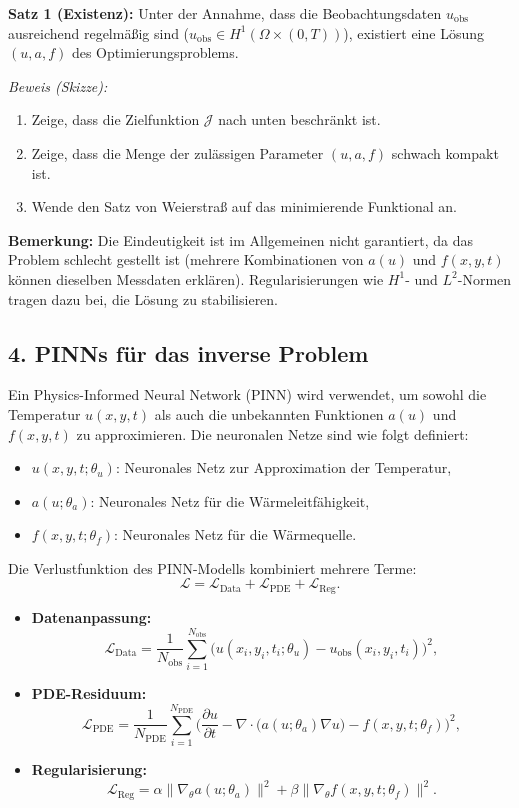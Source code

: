 \textbf{Satz 1 (Existenz):}  
Unter der Annahme, dass die Beobachtungsdaten \(u_\text{obs}\) ausreichend regelmäßig sind (\(u_\text{obs} \in H^1(\Omega \times (0, T))\)), existiert eine Lösung \((u, a, f)\) des Optimierungsproblems.

\textit{Beweis (Skizze):}
\begin{enumerate}
	\item Zeige, dass die Zielfunktion \(\mathcal{J}\) nach unten beschränkt ist.
	\item Zeige, dass die Menge der zulässigen Parameter \((u, a, f)\) schwach kompakt ist.
	\item Wende den Satz von Weierstraß auf das minimierende Funktional an.
\end{enumerate}

\textbf{Bemerkung:}  
Die Eindeutigkeit ist im Allgemeinen nicht garantiert, da das Problem schlecht gestellt ist (mehrere Kombinationen von \(a(u)\) und \(f(x, y, t)\) können dieselben Messdaten erklären). Regularisierungen wie \(H^1\)- und \(L^2\)-Normen tragen dazu bei, die Lösung zu stabilisieren.

\subsection*{4. PINNs für das inverse Problem}

Ein Physics-Informed Neural Network (PINN) wird verwendet, um sowohl die Temperatur \(u(x, y, t)\) als auch die unbekannten Funktionen \(a(u)\) und \(f(x, y, t)\) zu approximieren. Die neuronalen Netze sind wie folgt definiert:
\begin{itemize}
	\item \(u(x, y, t; \theta_u)\): Neuronales Netz zur Approximation der Temperatur,
	\item \(a(u; \theta_a)\): Neuronales Netz für die Wärmeleitfähigkeit,
	\item \(f(x, y, t; \theta_f)\): Neuronales Netz für die Wärmequelle.
\end{itemize}

Die Verlustfunktion des PINN-Modells kombiniert mehrere Terme:
\[
\mathcal{L} = \mathcal{L}_\text{Data} + \mathcal{L}_\text{PDE} + \mathcal{L}_\text{Reg}.
\]
\begin{itemize}
	\item \textbf{Datenanpassung:}
	\[
	\mathcal{L}_\text{Data} = \frac{1}{N_\text{obs}} \sum_{i=1}^{N_\text{obs}} \big(u(x_i, y_i, t_i; \theta_u) - u_\text{obs}(x_i, y_i, t_i)\big)^2,
	\]
	\item \textbf{PDE-Residuum:}
	\[
	\mathcal{L}_\text{PDE} = \frac{1}{N_\text{PDE}} \sum_{i=1}^{N_\text{PDE}} \bigg(\frac{\partial u}{\partial t} - \nabla \cdot \big(a(u; \theta_a) \nabla u\big) - f(x, y, t; \theta_f)\bigg)^2,
	\]
	\item \textbf{Regularisierung:}
	\[
	\mathcal{L}_\text{Reg} = \alpha \|\nabla_\theta a(u; \theta_a)\|^2 + \beta \|\nabla_\theta f(x, y, t; \theta_f)\|^2.
	\]
\end{itemize}

